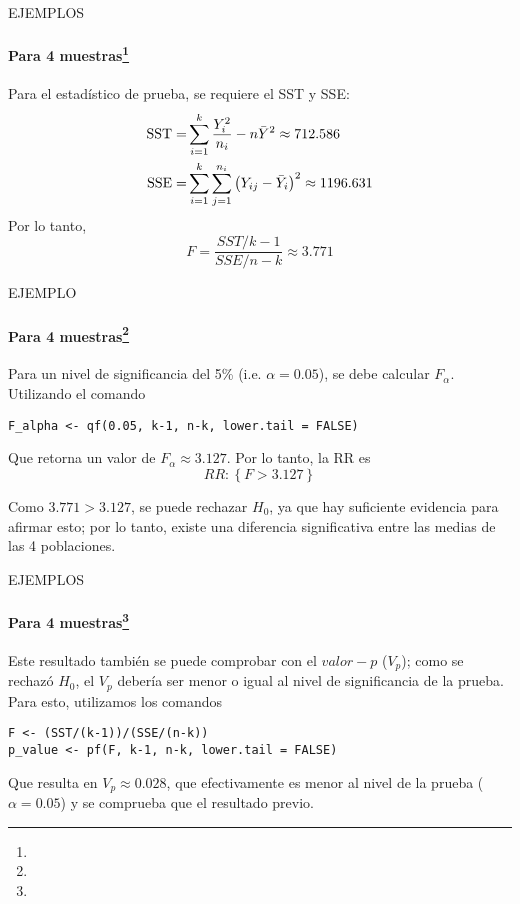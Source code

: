 \begin{frame}{EJEMPLOS}
    \framesubtitle{Para 4 muestras\footnote{}}
    Para el estadístico de prueba, se requiere el SST y SSE:
    \begin{equation*}
        \begin{split} \text{SST}=&\sum_{i=1}^{k}\dfrac{Y_i^2}{n_i}-n\Bar{Y}^2\approx712.586 \\\text{SSE}=&\sum_{i=1}^{k}\sum_{j=1}^{n_i}\left(Y_{ij}-\Bar{Y}_i\right)^2\approx1196.631
        \end{split}
    \end{equation*}
    Por lo tanto,
    \begin{equation*}
        F=\dfrac{SST\Big/k-1}{SSE\Big/n-k}\approx3.771
    \end{equation*}
    
\end{frame}

\begin{frame}{EJEMPLO}
\framesubtitle{Para 4 muestras\footnote{}}
    Para un nivel de significancia del 5\% (i.e. $\alpha=0.05$), se debe calcular $F_\alpha$. Utilizando el comando
    
    \begin{center}
    \texttt{F\_alpha <- qf(0.05, k-1, n-k, lower.tail = FALSE)}
    \end{center}
    
    Que retorna un valor de $F_\alpha\approx3.127$. Por lo tanto, la RR es
    \begin{equation*}
        RR:\left\{F>3.127\right\}
    \end{equation*}
    
    Como $3.771>3.127$, se puede rechazar $H_0$, ya que hay suficiente evidencia para afirmar esto; por lo tanto, existe una diferencia significativa entre las medias de las 4 poblaciones.
\end{frame}

\begin{frame}{EJEMPLOS}
    \framesubtitle{Para 4 muestras\footnote{}}
    Este resultado también se puede comprobar con el $valor-p$ ($V_p$); como se rechazó $H_0$, el $V_p$ debería ser menor o igual al nivel de significancia de la prueba. Para esto, utilizamos los comandos
    
    \begin{center}
        \texttt{F <- (SST/(k-1))/(SSE/(n-k))\\
        p\_value <- pf(F, k-1, n-k, lower.tail = FALSE)}
    \end{center}
    
    Que resulta en $V_p\approx0.028$, que efectivamente es menor al nivel de la prueba ($\alpha=0.05$) y se comprueba que el resultado previo.
\end{frame}

